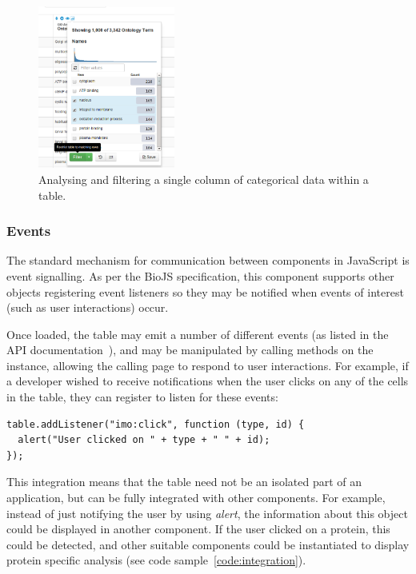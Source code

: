 \documentclass[10pt,a4paper,twocolumn]{article}
\begin{document}
\begin{figure}[t]
\centering
\includegraphics[width=0.4\textwidth]{category-column-summary.png}
\caption{
    \label{fig:cat-column-summary}
    Analysing and filtering a single column of categorical data within a table.
}
\end{figure}

\subsubsection*{Events}

The standard mechanism for communication between components in JavaScript is
event signalling. As per the BioJS specification, this component supports other
objects registering event listeners so they may be notified when events of
interest (such as user interactions) occur.

Once loaded, the table may emit a number of different events (as listed in the
API documentation~\cite{site:biojs-doc}), and may be manipulated by calling 
methods on the instance, allowing the calling page to respond to 
user interactions. For example, if a developer wished to receive notifications 
when the user clicks on any of the cells in the table, they can register to 
listen for these events:

\begin{lstlisting}[caption={Adding an Event Listener}, label={code:add-listener}]
table.addListener("imo:click", function (type, id) {
  alert("User clicked on " + type + " " + id);
});
\end{lstlisting}

This integration means that the table need not be an isolated part of an
application, but can be fully integrated with other components. For example,
instead of just notifying the user by using \emph{alert}, the information about
this object could be displayed in another component. If the user clicked on a
protein, this could be detected, and other suitable components could be
instantiated to display protein specific analysis (see code
sample~\ref{code:integration}).
\end{document}
